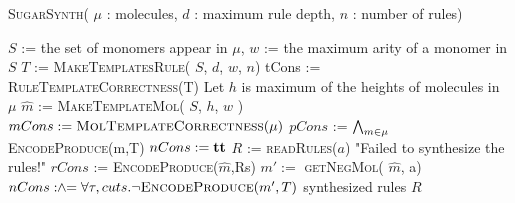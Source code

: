 \begin{algorithm}[t]
  \caption{ \textsc{SugarSynth}( $\mu$ : molecules, $d$ : maximum rule depth, $n$ : number of rules)}
  \label{alg:sugar-synth}
  \begin{algorithmic}[1]
  \State $S$ := the set of monomers appear in $\mu$, $w$ := the maximum arity of a monomer in $S$
  \State $T$ := \textsc{MakeTemplatesRule}( $S$, $d$, $w$, $n$)
  \label{line:createRtemp}
  \State tCons := \textsc{RuleTemplateCorrectness}(T)
  \label{line:ruleCorr}
  \State Let $h$ is maximum of the heights of molecules in $\mu$
  \State $\hat{m}$ := \textsc{MakeTemplateMol}( $S$, $h$, $w$ )
  \label{line:createMtemp}
  \State $mCons := \textsc{MolTemplateCorrectness}(\mu)$
  \label{line:molCorr}
  \State $pCons$ := $\bigwedge_{m \in \mu}$ \textsc{EncodeProduce}(m,T)
    \label{line:molenc}
  \State $nCons := \mathbf{tt}$
  \While{$\ltrue$}
    \label{line:posModel}
    \State $R$ := \textsc{readRules}($a$)
    \label{line:getR}
    \Else
       \State \Return "Failed to synthesize the rules!"
    \EndIf
    \State $rCons$ := \textsc{EncodeProduce}($\hat{m}$,Rs)
    \label{line:consNewR}
        \label{line:negModel}
        \State $m' :=$ \textsc{getNegMol}( $\hat{m}$, a)
        \State $nCons \mathrel{:\hspace{-3pt}\land\hspace{-3pt}=} \forall \tau,cuts. \lnot \textsc{EncodeProduce}(m',T)$
        \label{line:negCons}
    \Else
       \State \Return synthesized rules $R$
    \EndIf

  \EndWhile
  \end{algorithmic}
\end{algorithm}


